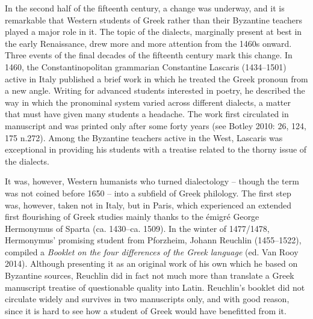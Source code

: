 \begin{styleStandard}
\end{styleStandard}

\begin{styleStandard}
In the second half of the fifteenth century, a change was underway, and it is remarkable that Western students of Greek rather than their Byzantine teachers played a major role in it. The topic of the dialects, marginally present at best in the early Renaissance, drew more and more attention from the 1460s onward. Three events of the final decades of the fifteenth century mark this change. In 1460, the Constantinopolitan grammarian Constantine Lascaris (1434–1501) active in Italy published a brief work in which he treated the Greek pronoun from a new angle. Writing for advanced students interested in poetry, he described the way in which the pronominal system varied across different dialects, a matter that must have given many students a headache. The work first circulated in manuscript and was printed only after some forty years (see Botley 2010: 26, 124, 175 n.272). Among the Byzantine teachers active in the West, Lascaris was exceptional in providing his students with a treatise related to the thorny issue of the dialects.
\end{styleStandard}

\begin{styleStandard}
It was, however, Western humanists who turned dialectology – though the term was not coined before 1650 – into a subfield of Greek philology. The first step was, however, taken not in Italy, but in Paris, which experienced an extended first flourishing of Greek studies mainly thanks to the émigré George Hermonymus of Sparta (ca. 1430–ca. 1509). In the winter of 1477/1478, Hermonymus’ promising student from Pforzheim, Johann Reuchlin (1455–1522), compiled a \textit{Booklet on the four differences of the Greek language} (ed. Van Rooy 2014). Although presenting it as an original work of his own which he based on Byzantine sources, Reuchlin did in fact not much more than translate a Greek manuscript treatise of questionable quality into Latin. Reuchlin’s booklet did not circulate widely and survives in two manuscripts only, and with good reason, since it is hard to see how a student of Greek would have benefitted from it.
\end{styleStandard}

